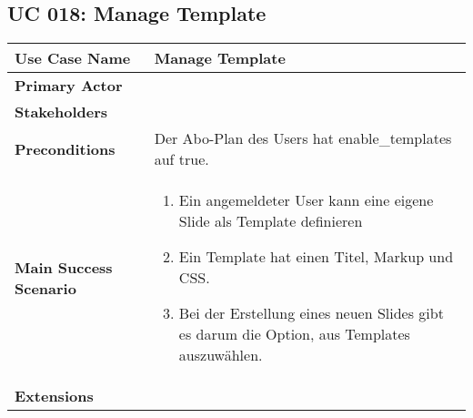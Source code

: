 \subsection{UC 018: Manage Template}
\label{uc:018-manage-template}

\begin{tabular}{|l|p{}|}
\hline
\textbf{Use Case Name} 	&	Manage Template	\\ \hline
\textbf{Primary Actor} 	&		\\ \hline
\textbf{Stakeholders}	&		\\ \hline
\textbf{Preconditions}	&	Der Abo-Plan des Users hat enable_templates auf true.	\\ \hline
\textbf{Main Success Scenario}	&
\begin{enumerate}
	\item Ein angemeldeter User kann eine eigene Slide als Template definieren
	\item Ein Template hat einen Titel, Markup und CSS.
	\item Bei der Erstellung eines neuen Slides gibt es darum die Option, aus Templates auszuwählen.
\end{enumerate}
\\ \hline
\textbf{Extensions}	& 	\\ \hline
\end{tabular}